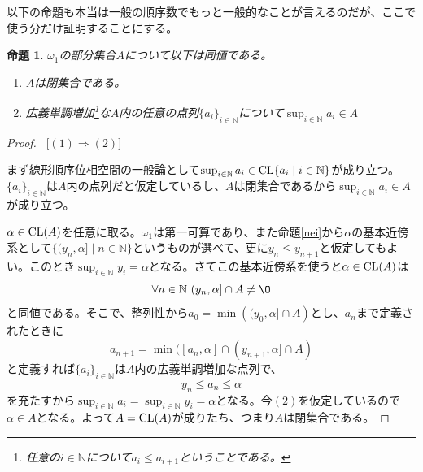\documentclass[leqno]{jsarticle}
\newtheorem{prop}[thm]{命題}
\newcommand{\To}{\Longrightarrow}
\newcommand{\nn}{\mathbb{N}}
\newcommand{\dpst}{\displaystyle}
\newcommand{\al}{\alpha}
\newcommand{\cl}{\text{{\rm CL}}}
\begin{document}
以下の命題も本当は一般の順序数でもっと一般的なことが言えるのだが、ここで使う分だけ証明することにする。
\begin{prop}\label{cl}
$\omega_1$の部分集合$A$について以下は同値である。
\begin{enumerate}
\item $A$は閉集合である。
\item 広義単調増加\footnote{任意の$i\in \nn$について$a_i\le a_{i+1}$ということである。}な$A$内の任意の点列$\{a_i\}_{i\in \nn}$について$\dpst \sup_{i\in \nn} a_i\in A$
\end{enumerate}
\end{prop}
\begin{proof}\ 
[$(1)\To (2)$]\par
まず線形順序位相空間の一般論として$\sup_{i\in \nn}a_i\in \cl\{a_i\mid i\in \nn\}$が成り立つ。$\{a_i\}_{i\in \nn}$は$A$内の点列だと仮定しているし、$A$は閉集合であるから$\sup_{i\in \nn}a_i\in A$が成り立つ。\par
[$(1)\To (2)$終わり]\par
[$(2)\To (1)$]\par
$\al\in \cl (A)$を任意に取る。$\omega_1$は第一可算であり、また命題\ref{nei}から$\al$の基本近傍系として$\{(y_n,\al]\mid n\in \nn\}$というものが選べて、更に$y_n\le y_{n+1}$と仮定してもよい。このとき$\sup_{i\in \nn}y_i=\al$となる。さてこの基本近傍系を使うと$\al\in \cl (A)$は
\[
\forall n\in \nn\ (y_n,\al]\cap A\neq \O
\]
と同値である。そこで、整列性から$a_0=\min\left((y_0,\al]\cap A\right)$とし、$a_n$まで定義されたときに
\[
a_{n+1}=\min ([a_n,\al]\cap (y_{n+1},\al]\cap A)
\]
と定義すれば$\{a_i\}_{i\in \nn}$は$A$内の広義単調増加な点列で、
\[
y_n\le a_n\le \al
\]
を充たすから$\sup_{i\in \nn}a_i=\sup_{i\in \nn}y_i=\al$となる。今$(2)$を仮定しているので$\al\in A$となる。よって$A=\cl(A)$が成りたち、つまり$A$は閉集合である。
\end{proof}
\end{document}
